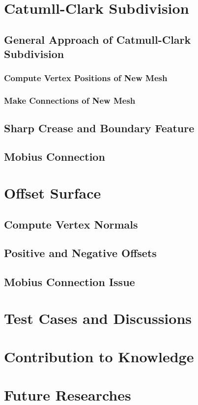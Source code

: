 \documentclass[12pt]{article}
\begin{document}
\section{Catumll-Clark Subdivision} \label{sec:ccsd}

\subsection{General Approach of Catmull-Clark Subdivision}

\subsubsection{Compute Vertex Positions of New Mesh}

\subsubsection{Make Connections of New Mesh}

\subsection{Sharp Crease and Boundary Feature}

\subsection{Mobius Connection}

\section{Offset Surface} \label{sec:offset}

\subsection{Compute Vertex Normals}

\subsection{Positive and Negative Offsets}

\subsection{Mobius Connection Issue}


\section{Test Cases and Discussions}



\section{Contribution to Knowledge}




\section{Future Researches}
\end{document}

